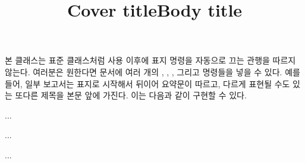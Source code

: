 본 클래스는 표준 클래스처럼 \cmd{\maketitle} 사용 이후에 표지 명령을 자동으로
끄는 관행을 따르지 않는다.
여러분은 원한다면 문서에 여러 개의 \cmd{\title}, \cmd{\author}, ,
그리고 \cmd{\maketitle} 명령들을 넣을 수 있다.
예를 들어, 일부 보고서는 표지로 시작해서 뒤이어 요약문이 따르고, 다르게 표현될
수도 있는 또다른 제목을 본문 앞에 가진다.
이는 다음과 같이 구현할 수 있다.
\begin{lcode}
\title{Cover title}
...
\begin{titlingpage}
\maketitle
\end{titlingpage}
...
\title{Body title}
\maketitle
...
\end{lcode}

